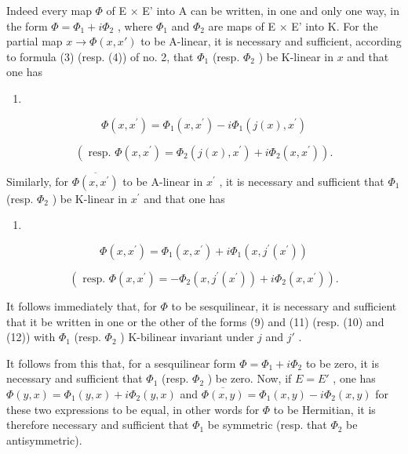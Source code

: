 Indeed every map \(\Phi\) of E × E' into A can be written, in one and only one way, in the form \(\Phi = \Phi_1 + i\Phi_2\) , where \(\Phi_1\) and \(\Phi_2\) are maps of E × E' into K. For the partial map \(x \to \Phi(x, x')\) to be A-linear, it is necessary and sufficient, according to formula (3) (resp. (4)) of no. 2, that \(\Phi_1\) (resp. \(\Phi_2\) ) be K-linear in \(x\) and that one has

\begin{enumerate}
\def\labelenumi{(\arabic{enumi})}
\setcounter{enumi}{8}
\tightlist
\item
\end{enumerate}

\[
\Phi (x, x ^ {\prime}) = \Phi_ {1} (x, x ^ {\prime}) - i \Phi_ {1} (j (x), x ^ {\prime})\tag{10}
\]

\[
(\text { resp. } \Phi (x, x ^ {\prime}) = \Phi_ {2} (j (x), x ^ {\prime}) + i \Phi_ {2} (x, x ^ {\prime})).
\]

Similarly, for \(\overline{\Phi(x,x^{\prime})}\) to be A-linear in \(x^{\prime}\) , it is necessary and sufficient that \(\Phi_{1}\) (resp. \(\Phi_{2}\) ) be K-linear in \(x^{\prime}\) and that one has

\begin{enumerate}
\def\labelenumi{(\arabic{enumi})}
\setcounter{enumi}{10}
\tightlist
\item
\end{enumerate}

\[
\Phi (x, x ^ {\prime}) = \Phi_ {1} (x, x ^ {\prime}) + i \Phi_ {1} (x, j ^ {\prime} (x ^ {\prime}))\tag{12}
\]

\[
(\text { resp. } \Phi (x, x ^ {\prime}) = - \Phi_ {2} (x, j ^ {\prime} (x ^ {\prime})) + i \Phi_ {2} (x, x ^ {\prime})).
\]

It follows immediately that, for \(\Phi\) to be sesquilinear, it is necessary and sufficient that it be written in one or the other of the forms (9) and (11) (resp. (10) and (12)) with \(\Phi_{1}\) (resp. \(\Phi_{2}\) ) K-bilinear invariant under \(j\) and \(j'\) .

It follows from this that, for a sesquilinear form \(\Phi = \Phi_{1} + i\Phi_{2}\) to be zero, it is necessary and sufficient that \(\Phi_{1}\) (resp. \(\Phi_{2}\) ) be zero. Now, if \(E = E'\) , one has \(\Phi(y, x) = \Phi_{1}(y, x) + i\Phi_{2}(y, x)\) and \(\overline{\Phi(x, y)} = \Phi_{1}(x, y) - i\Phi_{2}(x, y)\) for these two expressions to be equal, in other words for \(\Phi\) to be Hermitian, it is therefore necessary and sufficient that \(\Phi_{1}\) be symmetric (resp. that \(\Phi_{2}\) be antisymmetric).

